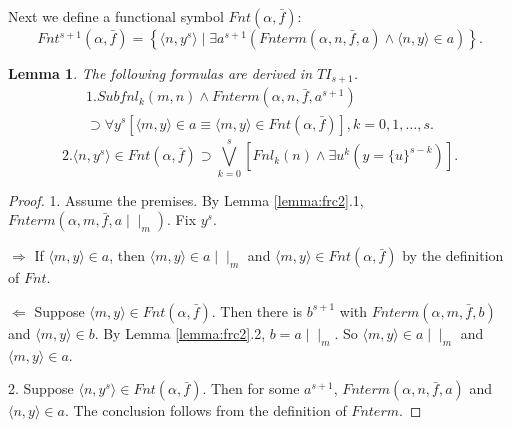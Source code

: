 \documentclass{asl}
\newtheorem{lemma}{Lemma}[section]
\theoremstyle{definition}
\begin{document}
Next we define a functional symbol $Fnt(\alpha,\bar{f})$:
\[Fnt^{s+1}(\alpha,\bar{f})=\left\lbrace \langle n,y^s\rangle \mid \exists a^{s+1}(Fnterm(\alpha,n,\bar{f},a)\wedge\langle n,y\rangle\in a)\right\rbrace.\]

\begin{lemma}
The following formulas are derived in $TI_{s+1}$.
\begin{multline*}
1. Subfnl_k(m,n)\wedge Fnterm(\alpha,n,\bar{f},a^{s+1})
\\
\supset\forall y^s\left[ \langle m,y\rangle\in a
\equiv\langle m,y\rangle\in Fnt(\alpha,\bar{f})\right],
k=0,1,\dots,s.
\end{multline*}
\[2. \langle n,y^s\rangle\in Fnt(\alpha,\bar{f})\supset \bigvee_{k=0}^s\left[Fnl_k(n)\wedge \exists u^k\left(y=\lbrace u\rbrace^{s-k}\right) \right].\]
\label{lemma:frc4}
\end{lemma}
\begin{proof}
1. Assume the premises. By Lemma \ref{lemma:frc2}.1, $Fnterm(\alpha,m,\bar{f},a\mid\mid_m)$. Fix $y^s$.

$\Rightarrow$ If $\langle m,y\rangle\in a$, then $\langle m,y\rangle\in a\mid\mid_m$ and $\langle m,y\rangle\in Fnt(\alpha,\bar{f})$ by the definition of $Fnt$.

$\Leftarrow$ Suppose $\langle m,y\rangle\in Fnt(\alpha,\bar{f})$. Then there is $b^{s+1}$ with $Fnterm(\alpha,m,\bar{f},b)$ and $\langle m,y\rangle\in b$. By Lemma \ref{lemma:frc2}.2, $b=a\mid\mid_m$. So $\langle m,y\rangle\in a\mid\mid_m$ and $\langle m,y\rangle\in a$.

2. Suppose $\langle n,y^s\rangle\in Fnt(\alpha,\bar{f})$. Then for some $a^{s+1}$, $Fnterm(\alpha,n,\bar{f},a)$ and $\langle n,y\rangle\in a$. The conclusion follows from the definition of $Fnterm$.
\end{proof}
\end{document}
